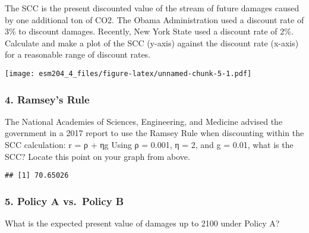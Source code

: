 \documentclass[
]{article}
\newenvironment{Shaded}{\begin{snugshade}}{\end{snugshade}}
\newcommand{\CommentTok}[1]{\textcolor[rgb]{0.56,0.35,0.01}{\textit{#1}}}
\newcommand{\DecValTok}[1]{\textcolor[rgb]{0.00,0.00,0.81}{#1}}
\newcommand{\FloatTok}[1]{\textcolor[rgb]{0.00,0.00,0.81}{#1}}
\newcommand{\KeywordTok}[1]{\textcolor[rgb]{0.13,0.29,0.53}{\textbf{#1}}}
\newcommand{\NormalTok}[1]{#1}
\newcommand{\OperatorTok}[1]{\textcolor[rgb]{0.81,0.36,0.00}{\textbf{#1}}}
\newcommand{\StringTok}[1]{\textcolor[rgb]{0.31,0.60,0.02}{#1}}
\begin{document}
The SCC is the present discounted value of the stream of future damages
caused by one additional ton of CO2. The Obama Administration used a
discount rate of 3\% to discount damages. Recently, New York State used
a discount rate of 2\%. Calculate and make a plot of the SCC (y-axis)
against the discount rate (x-axis) for a reasonable range of discount
rates.

\texttt{[image: esm204\_4\_files/figure-latex/unnamed-chunk-5-1.pdf]}

\hypertarget{ramseys-rule}{%
\subsubsection{4. Ramsey's Rule}\label{ramseys-rule}}

The National Academies of Sciences, Engineering, and Medicine advised
the government in a 2017 report to use the Ramsey Rule when discounting
within the SCC calculation: r = ρ + ηg Using ρ = 0.001, η = 2, and g =
0.01, what is the SCC? Locate this point on your graph from above.

\begin{Shaded}
\end{Shaded}

\begin{verbatim}
## [1] 70.65026
\end{verbatim}

\hypertarget{policy-a-vs.-policy-b}{%
\subsubsection{5. Policy A vs.~Policy B}\label{policy-a-vs.-policy-b}}

What is the expected present value of damages up to 2100 under Policy A?
\end{document}
